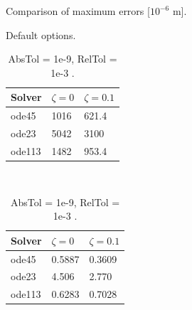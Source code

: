 \documentclass{article}
\begin{document}
	\begin{table}[h]
		\centering
		\def\arraystretch{1.1}
		\caption{Comparison of maximum errors [$10^{-6}$ m].}
		\begin{subtable}[t]{0.4\textwidth}
			\centering
			\caption{Default options.}
			\begin{tabular}{|l|l|l|}
				\hline
				Solver & $\zeta = 0$ & $\zeta = 0.1$\\
				\hline
				ode45  & 1016 & 621.4 \\
				ode23  & 5042 & 3100 \\
				ode113 & 1482 & 953.4 \\
				\hline
			\end{tabular}
		\end{subtable}
		~
		\begin{subtable}[t]{0.4\textwidth}
			\centering
			\caption{AbsTol = 1e-9, RelTol = 1e-3 .}
			\begin{tabular}{|l|l|l|}
				\hline
				Solver & $\zeta = 0$ & $\zeta = 0.1$\\
				\hline
				ode45  & 0.5887 & 0.3609 \\
				ode23  & 4.506 & 2.770 \\
				ode113 & 0.6283 & 0.7028 \\
				\hline
			\end{tabular}
		\end{subtable}
		\label{tab:error_comparison}
	\end{table}
	
\end{document}
